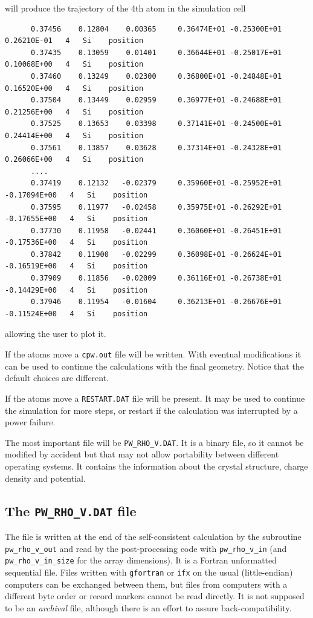 \documentclass[11pt]{article}
\begin{document}
will produce the trajectory of the 4th atom in the simulation cell
\begin{verbatim}
      0.37456    0.12804    0.00365     0.36474E+01 -0.25300E+01  0.26210E-01   4   Si    position
      0.37435    0.13059    0.01401     0.36644E+01 -0.25017E+01  0.10068E+00   4   Si    position
      0.37460    0.13249    0.02300     0.36800E+01 -0.24848E+01  0.16520E+00   4   Si    position
      0.37504    0.13449    0.02959     0.36977E+01 -0.24688E+01  0.21256E+00   4   Si    position
      0.37525    0.13653    0.03398     0.37141E+01 -0.24500E+01  0.24414E+00   4   Si    position
      0.37561    0.13857    0.03628     0.37314E+01 -0.24328E+01  0.26066E+00   4   Si    position
      ....
      0.37419    0.12132   -0.02379     0.35960E+01 -0.25952E+01 -0.17094E+00   4   Si    position
      0.37595    0.11977   -0.02458     0.35975E+01 -0.26292E+01 -0.17655E+00   4   Si    position
      0.37730    0.11958   -0.02441     0.36060E+01 -0.26451E+01 -0.17536E+00   4   Si    position
      0.37842    0.11900   -0.02299     0.36098E+01 -0.26624E+01 -0.16519E+00   4   Si    position
      0.37909    0.11856   -0.02009     0.36116E+01 -0.26738E+01 -0.14429E+00   4   Si    position
      0.37946    0.11954   -0.01604     0.36213E+01 -0.26676E+01 -0.11524E+00   4   Si    position
\end{verbatim}
allowing the user to plot it.

If the atoms move a {\tt cpw.out} file will be written.  With eventual modifications it can be used
to continue the calculations with the final geometry.  Notice that the default choices are different.

If the atoms move a {\tt RESTART.DAT} file will be present.  It may be used to continue the
simulation for more steps, or restart if the calculation was interrupted by a power failure.

The most important file will be {\tt PW\_RHO\_V.DAT}.  It is a binary file, so it cannot be modified by accident
but that may not allow portability between different operating systems.
It contains the information about the crystal structure, charge density and potential.

\subsection{The \texttt{PW\_RHO\_V.DAT} file}

The file is written at the end of the self-consistent calculation by the subroutine
\texttt{pw\_rho\_v\_out} and read by the post-processing code with \texttt{pw\_rho\_v\_in}
(and \texttt{pw\_rho\_v\_in\_size} for the array dimensions).
It is a Fortran unformatted sequential file.  Files written with \texttt{gfortran} or \texttt{ifx}
on the usual (little-endian) computers can be exchanged between them,
but files from computers with a different byte order or record markers cannot be read directly.
It is not supposed to be an {\it archival} file, although there is an effort to assure back-compatibility.
\end{document}
